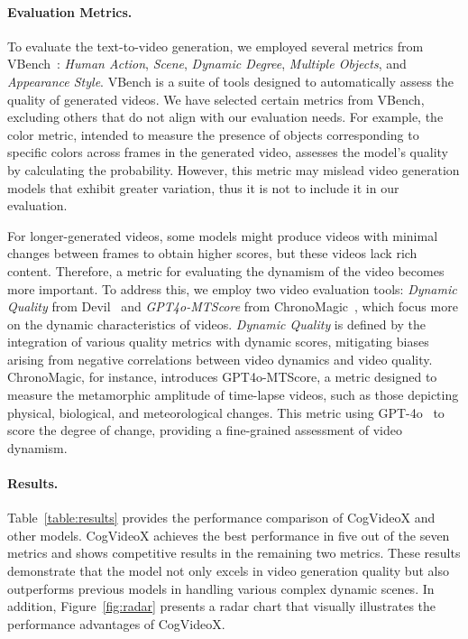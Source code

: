 \documentclass{article} \usepackage{iclr2024_conference,times}
\newcommand{\model}{CogVideoX\xspace}
\begin{document}
\paragraph{Evaluation Metrics.} 
To evaluate the text-to-video generation, we employed several metrics from VBench~\cite{huang2023vbench}: \emph{Human Action}, \emph{Scene}, \emph{Dynamic Degree}, \emph{Multiple Objects}, and \emph{Appearance Style}. 
VBench is a suite of tools designed to automatically assess the quality of generated videos. We have selected certain metrics from VBench, excluding others that do not align with our evaluation needs. 
For example, the color metric, intended to measure the presence of objects corresponding to specific colors across frames in the generated video, assesses the model's quality by calculating the probability. 
However, this metric may mislead video generation models that exhibit greater variation, thus it is not to include it in our evaluation. 

For longer-generated videos, some models might produce videos with minimal changes between frames to obtain higher scores, but these videos lack rich content. 
Therefore, a metric for evaluating the dynamism of the video becomes more important. 
To address this, we employ two video evaluation tools:  \emph{Dynamic Quality} from Devil~\cite{liao2024evaluationtexttovideogenerationmodels} and \emph{GPT4o-MTScore} from ChronoMagic~\cite{yuan2024chronomagic}, which focus more on the dynamic characteristics of videos. 
\emph{Dynamic Quality} is defined by the integration of various quality metrics with dynamic scores, mitigating biases arising from negative correlations between video dynamics and video quality.
ChronoMagic, for instance, introduces {GPT4o-MTScore}, a metric designed to measure the metamorphic amplitude of time-lapse videos, such as those depicting physical, biological, and meteorological changes. 
This metric using GPT-4o~\cite{gpt4o} to score the degree of change, providing a fine-grained assessment of video dynamism. 




\paragraph{Results.} 
Table~\ref{table:results} provides the performance comparison of \model and other models. 
\model achieves the best performance in five out of the seven metrics and shows competitive results in the remaining two metrics. 
These results demonstrate that the model not only excels in video generation quality but also outperforms previous models in handling various complex dynamic scenes. 
In addition, Figure~\ref{fig:radar} presents a radar chart that visually illustrates the performance advantages of \model.
\end{document}
